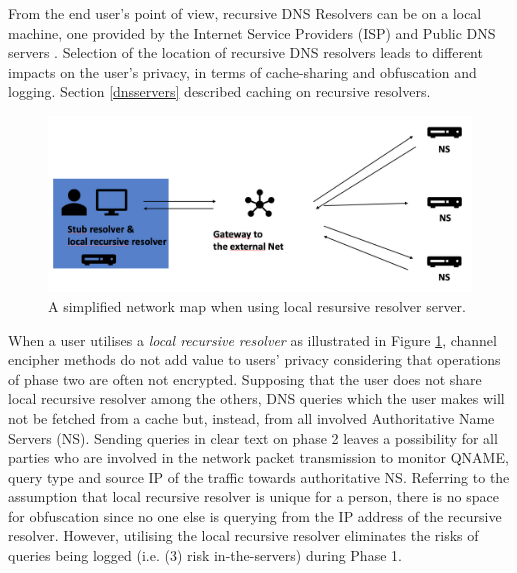 From the end user's point of view, recursive DNS Resolvers can be on a local machine, one provided by the Internet Service Providers (ISP) and Public DNS servers \cite{van2018privacy}.
Selection of the location of recursive DNS resolvers leads to different impacts on the user's privacy, in terms of cache-sharing\cite{van2018privacy, wang2013analysis} and obfuscation and logging. Section \ref{dnsservers} described caching on recursive resolvers.

\begin{figure}[ht!]
    \begin{center}
    \includegraphics*[width=0.9\columnwidth]{img/local-recursive}
    \end{center}
    \caption{A simplified network map when using local resursive resolver server.}
    \label{localrecursive}
\end{figure}
When a user utilises a \textit{local recursive resolver} as illustrated in Figure \ref{localrecursive}, channel encipher methods do not add value to users' privacy considering that operations of phase two are often not encrypted.
Supposing that the user does not share local recursive resolver among the others, DNS queries which the user makes will not be fetched from a cache but, instead, from all involved Authoritative Name Servers (NS).
Sending queries in clear text on phase 2 leaves a possibility for all parties who are involved in the network packet transmission to monitor QNAME, query type and source IP of the traffic towards authoritative NS.
Referring to the assumption that local recursive resolver is unique for a person, there is no space for obfuscation since no one else is querying from the IP address of the recursive resolver.
However, utilising the local recursive resolver eliminates the risks of queries being logged (i.e. (3) risk in-the-servers) during Phase 1.


